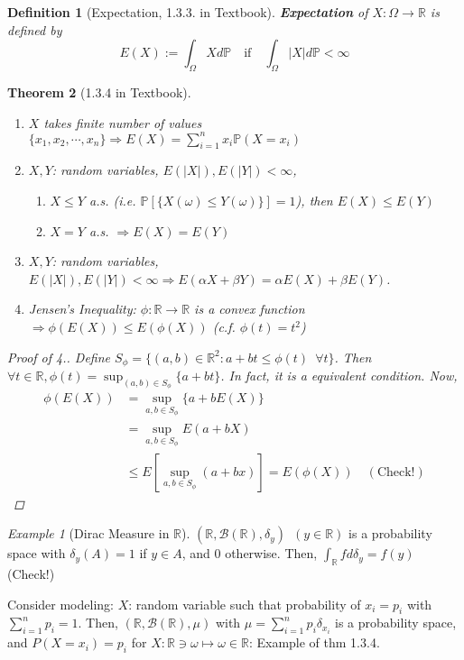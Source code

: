 \documentclass[12pt]{report}
\theoremstyle{break}
\newtheorem{thm}{Theorem}[section] %
\theoremstyle{newdef}
\newtheorem{defn}[thm]{Definition} %
\theoremstyle{remark}
\newtheorem*{exmp}{Example} %
\begin{document}
\begin{defn}[Expectation, 1.3.3. in Textbook]
\textbf{Expectation} of $X : \Omega \rightarrow \mathbb{R}$ is defined by
$$E(X) := \int_\Omega X d\mathbb{P} \quad \text{if} \quad \int_{\Omega}|X|d\mathbb{P} < \infty$$ 
\end{defn}

\begin{thm}[1.3.4 in Textbook]
\leavevmode
\vspace{-6mm}
\begin{enumerate}
\item $X$ takes finite number of values $\{x_1,x_2, \cdots, x_n\} \Rightarrow E(X) = \sum_{i=1}^n x_i\mathbb{P}(X = x_i)$
\item $X, Y$: random variables, $E(|X|), E(|Y|) < \infty$,
\begin{enumerate}[label = (\roman*)]
\item $X \leq Y$ a.s. (i.e. $\mathbb{P}[\{X(\omega) \leq Y(\omega)\}]=1$), then $E(X) \leq E(Y)$
\item $X = Y$ a.s. $\Rightarrow E(X) = E(Y)$
\end{enumerate}
\item $X, Y$: random variables, $E(|X|), E(|Y|) < \infty \Rightarrow E(\alpha X + \beta Y) = \alpha E(X) + \beta E(Y)$.
\item Jensen's Inequality: $\phi : \mathbb{R} \rightarrow \mathbb{R}$ is a convex function $\Rightarrow \phi(E(X)) \leq E(\phi(X))$ (c.f. $\phi(t) = t^2$)
\end{enumerate}

\begin{proof}[Proof of 4.]
Define $S_\phi = \{(a,b) \in \mathbb{R}^2 : a + bt \leq \phi(t) \enspace \forall t\}$.
Then $\forall t \in \mathbb{R}, \phi(t) = \sup_{(a,b) \in S_\phi} \{a+bt\}$.
In fact, it is a equivalent condition. Now,
$$
\begin{aligned}
\phi(E(X)) &= \sup_{a,b\in S_\phi} \{a + bE(X)\}\\
&= \sup_{a,b \in S_\phi} E(a+bX)\\
&\leq E[\sup_{a,b\in S_\phi}(a+bx)] = E(\phi(X)) \quad (\text{Check!})
\end{aligned}
$$
\end{proof}
\end{thm}


\begin{exmp}[Dirac Measure in $\mathbb{R}$]
$(\mathbb{R}, \mathcal{B}(\mathbb{R}), \delta_y) \enspace (y \in \mathbb{R})$ is a probability space with $\delta_y(A) = 1$ if $y \in A$, and $0$ otherwise.
Then, $\int_\mathbb{R} fd\delta_y = f(y)$ (Check!)

\vspace{6mm}
Consider modeling: $X$: random variable such that probability of $x_i = p_i$ with $\sum_{i=1}^n p_i = 1$.
Then, $(\mathbb{R}, \mathcal{B}(\mathbb{R}), \mu)$ with $\mu = \sum_{i=1}^n p_i\delta_{x_i}$ is a probability space, and $P(X = x_i) = p_i$ for $X : \mathbb{R} \ni \omega \mapsto \omega \in \mathbb{R}$: Example of thm 1.3.4.
\end{exmp}
\end{document}
